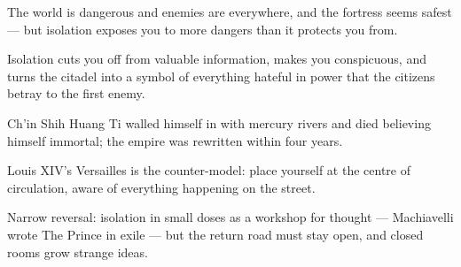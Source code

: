 

\begin{distilled}
  \item The world is dangerous and enemies are everywhere, and the fortress seems safest --- but isolation exposes you to more dangers than it protects you from.
  \item Isolation cuts you off from valuable information, makes you conspicuous, and turns the citadel into a symbol of everything hateful in power that the citizens betray to the first enemy.
  \item Ch'in Shih Huang Ti walled himself in with mercury rivers and died believing himself immortal; the empire was rewritten within four years.
  \item Louis XIV's Versailles is the counter-model: place yourself at the centre of circulation, aware of everything happening on the street.
  \item Narrow reversal: isolation in small doses as a workshop for thought --- Machiavelli wrote The Prince in exile --- but the return road must stay open, and closed rooms grow strange ideas.
\end{distilled}
